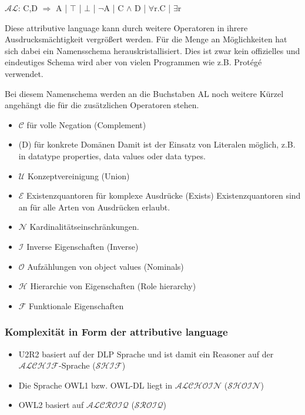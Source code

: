 $\mathcal{AL}$: C,D $\Longrightarrow$ A | $\top$ | $\bot$ | $\lnot$A | C $\land$ D | $\forall$r.C | $\exists$r

Diese attributive language kann durch weitere Operatoren in ihrere Ausdrucksmächtigkeit vergrößert werden. Für die Menge an Möglichkeiten hat sich dabei ein Namensschema herauskristallisiert. Dies ist zwar kein offizielles und eindeutiges Schema wird aber von vielen Programmen wie z.B. Protégé verwendet.

Bei diesem Namenschema werden an die Buchstaben AL noch weitere Kürzel angehängt die für die zusätzlichen Operatoren stehen.
\begin{itemize}
  \item $\mathcal{C}$ für volle Negation (Complement)
  \item (D) für konkrete Domänen\newline
Damit ist der Einsatz von Literalen möglich, z.B. in datatype properties, data values oder data types.
  \item $\mathcal{U}$ Konzeptvereinigung (Union)
  \item $\mathcal{E}$ Existenzquantoren für komplexe Ausdrücke (Exists)\newline
Existenzquantoren sind an für alle Arten von Ausdrücken erlaubt.
  \item $\mathcal{N}$ Kardinalitätseinschränkungen.
  \item $\mathcal{I}$ Inverse Eigenschaften (Inverse)
  \item $\mathcal{O}$ Aufzählungen von object values (Nominals)
  \item $\mathcal{H}$ Hierarchie von Eigenschaften (Role hierarchy)
  \item $\mathcal{F}$ Funktionale Eigenschaften
\end{itemize}
\cite{wiki:DL}

\subsubsection{Komplexität in Form der attributive language}
\begin{itemize}
  \item U2R2 basiert auf der DLP Sprache und ist damit ein Reasoner auf der $\mathcal{ALCHIF}$-Sprache ($\mathcal{SHIF}$)
  \item Die Sprache OWL1 bzw. OWL-DL liegt in $\mathcal{ALCHOIN}$ ($\mathcal{SHOIN}$)
  \item OWL2 basiert auf $\mathcal{ALCROIQ}$ ($\mathcal{SROIQ}$) \cite{Krötzsch2008}
\end{itemize}


